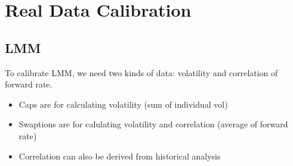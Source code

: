 \section{Real Data Calibration}

\subsection{LMM}
To calibrate LMM, we need two kinds of data: volatility and correlation of forward rate. 
\begin{itemize}
\item {\color{red} Caps are for calculating volatility (sum of individual vol)}
\item {\color{red} Swaptions are for calulating volatility and correlation (average of forward rate)}
\item Correlation can also be derived from historical analysis
\end{itemize}